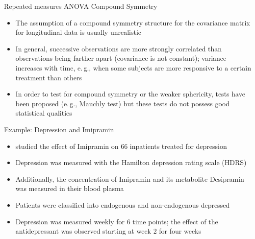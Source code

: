 \documentclass{beamer}
\begin{document}
\begin{frame}{Repeated measures ANOVA}
{Compound Symmetry}
  \begin{itemize}
    \item The assumption of a compound symmetry structure for the
      covariance matrix for longitudinal data is usually unrealistic
    \item In general, successive observations are more strongly correlated
      than observations being farther apart (covariance is not constant);
      variance increases with time, e.\,g., when some subjects are more
      responsive to a certain treatment than others
    \item In order to test for compound symmetry or the weaker sphericity,
      tests have been proposed (e.\,g., Mauchly test) but these tests do
      not possess good statistical qualities
  \end{itemize}
\end{frame}

\begin{frame}{Example: Depression and Imipramin}
  \begin{itemize}
    \item \citet{ReisbyGram77} studied the effect of Imipramin on 66
      inpatients treated for depression
    \item Depression was measured with the Hamilton depression rating scale
      (HDRS)
    \item Additionally, the concentration of Imipramin and its metabolite
      Desipramin was measured in their blood plasma
    \item Patients were classified into endogenous and non-endogenous
      depressed
    \item Depression was measured weekly for 6 time points; the effect of
      the antidepressant was observed starting at week 2 for four weeks
  \end{itemize}
\end{frame}
\end{document}
